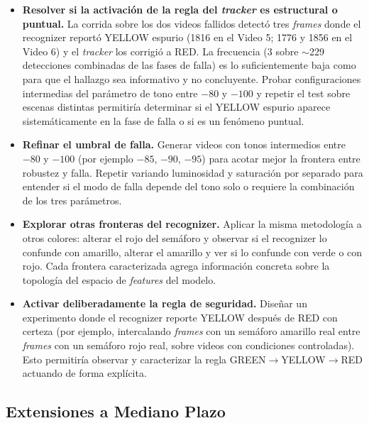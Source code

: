 \begin{itemize}
    \item \textbf{Resolver si la activación de la regla del \textit{tracker} es estructural o puntual.} La corrida sobre los dos videos fallidos detectó tres \textit{frames} donde el recognizer reportó YELLOW espurio (1816 en el Video 5; 1776 y 1856 en el Video 6) y el \textit{tracker} los corrigió a RED. La frecuencia (3 sobre $\sim$229 detecciones combinadas de las fases de falla) es lo suficientemente baja como para que el hallazgo sea informativo y no concluyente. Probar configuraciones intermedias del parámetro de tono entre $-80$ y $-100$ y repetir el test sobre escenas distintas permitiría determinar si el YELLOW espurio aparece sistemáticamente en la fase de falla o si es un fenómeno puntual.

    \item \textbf{Refinar el umbral de falla.} Generar videos con tonos intermedios entre $-80$ y $-100$ (por ejemplo $-85$, $-90$, $-95$) para acotar mejor la frontera entre robustez y falla. Repetir variando luminosidad y saturación por separado para entender si el modo de falla depende del tono solo o requiere la combinación de los tres parámetros.

    \item \textbf{Explorar otras fronteras del recognizer.} Aplicar la misma metodología a otros colores: alterar el rojo del semáforo y observar si el recognizer lo confunde con amarillo, alterar el amarillo y ver si lo confunde con verde o con rojo. Cada frontera caracterizada agrega información concreta sobre la topología del espacio de \textit{features} del modelo.

    \item \textbf{Activar deliberadamente la regla de seguridad.} Diseñar un experimento donde el recognizer reporte YELLOW después de RED con certeza (por ejemplo, intercalando \textit{frames} con un semáforo amarillo real entre \textit{frames} con un semáforo rojo real, sobre videos con condiciones controladas). Esto permitiría observar y caracterizar la regla GREEN$\to$YELLOW$\to$RED actuando de forma explícita.
\end{itemize}

\subsection{Extensiones a Mediano Plazo}

